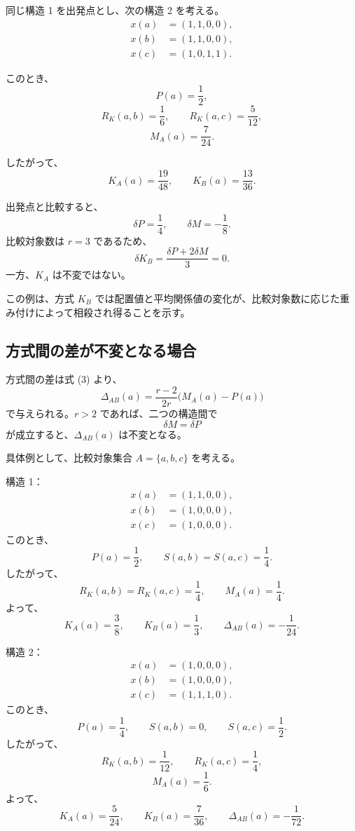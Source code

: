 \documentclass[a4paper,11pt]{ltjsarticle}
\begin{document}
同じ構造 1 を出発点とし、次の構造 2 を考える。
\[
\begin{aligned}
x(a)&=(1,1,0,0),\\
x(b)&=(1,1,0,0),\\
x(c)&=(1,0,1,1).
\end{aligned}
\]

このとき、
\[
P(a)=\frac12,
\]
\[
R_K(a,b)=\frac16,\qquad
R_K(a,c)=\frac5{12},
\]
\[
M_A(a)=\frac7{24}.
\]

したがって、
\[
K_A(a)=\frac{19}{48},\qquad
K_B(a)=\frac{13}{36}.
\]

出発点と比較すると、
\[
\delta P=\frac14,\qquad
\delta M=-\frac18.
\]
比較対象数は $r=3$ であるため、
\[
\delta K_B
=\frac{\delta P+2\delta M}{3}
=0.
\]
一方、$K_A$ は不変ではない。

この例は、方式 $K_B$ では配置値と平均関係値の変化が、比較対象数に応じた重み付けによって相殺され得ることを示す。

\subsection{方式間の差が不変となる場合}

方式間の差は式 (3) より、
\[
\Delta_{AB}(a)=
\frac{r-2}{2r}\bigl(M_A(a)-P(a)\bigr)
\]
で与えられる。$r>2$ であれば、二つの構造間で
\[
\boxed{\delta M=\delta P}
\tag{9}
\]
が成立すると、$\Delta_{AB}(a)$ は不変となる。

具体例として、比較対象集合 $A=\{a,b,c\}$ を考える。

構造 1：
\[
\begin{aligned}
x(a)&=(1,1,0,0),\\
x(b)&=(1,0,0,0),\\
x(c)&=(1,0,0,0).
\end{aligned}
\]
このとき、
\[
P(a)=\frac12,\qquad
S(a,b)=S(a,c)=\frac14.
\]
したがって、
\[
R_K(a,b)=R_K(a,c)=\frac14,
\qquad
M_A(a)=\frac14.
\]
よって、
\[
K_A(a)=\frac38,\qquad
K_B(a)=\frac13,\qquad
\Delta_{AB}(a)=-\frac1{24}.
\]

構造 2：
\[
\begin{aligned}
x(a)&=(1,0,0,0),\\
x(b)&=(1,0,0,0),\\
x(c)&=(1,1,1,0).
\end{aligned}
\]
このとき、
\[
P(a)=\frac14,\qquad
S(a,b)=0,\qquad
S(a,c)=\frac12.
\]
したがって、
\[
R_K(a,b)=\frac1{12},\qquad
R_K(a,c)=\frac14,
\]
\[
M_A(a)=\frac16.
\]
よって、
\[
K_A(a)=\frac5{24},\qquad
K_B(a)=\frac7{36},\qquad
\Delta_{AB}(a)=-\frac1{72}.
\]
\end{document}
